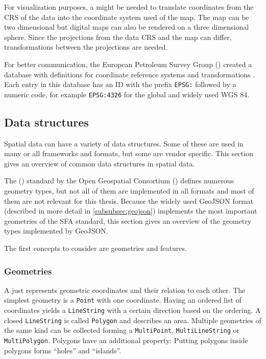 		For visualization purposes, a  might be needed to translate coordinates from the CRS of the data into the coordinate system used of the map.
		The map can be two dimensional but digital maps can also be rendered on a three dimensional sphere.
		Since the projections from the data CRS and the map can differ, transformations between the projections are needed.
		
		For better communication, the European Petroleum Survey Group () created a database with definitions for coordinate reference systems and transformations \cite{epsg}.
		Each entry in this database has an ID with the prefix \texttt{EPSG:} followed by a numeric code, for example \texttt{EPSG:4326} for the global and widely used WGS 84.
		
	\subsection{Data structures}
	\label{subsec:data-structures}
	
		Spatial data can have a variety of data structures.
		Some of these are used in many or all frameworks and formats, but some are vendor specific.
		This section gives an overview of common data structures in spatial data.
		
		The  () standard by the Open Geospatial Consortium () defines numerous geometry types\cite{ogc-sfa}, but not all of them are implemented in all formats and most of them are not relevant for this thesis.
		Because the widely used GeoJSON format (described in more detail in \cref{subsubsec:geojson}) implements the most important geometries of the SFA standard\cite{ietf-geojson}, this section gives an overview of the geometry types implemented by GeoJSON.
		
		The first concepts to consider are geometries and features.
		
		\subsubsection{Geometries}
		
			A  just represents geometric coordinates and their relation to each other.
			The simplest geometry is a \texttt{Point} with one coordinate.
			Having an ordered list of coordinates yields a \texttt{LineString} with a certain direction based on the ordering.
			A closed \texttt{LineString} is called \texttt{Polygon} and describes an area.
			Multiple geometries of the same kind can be collected forming a \texttt{MultiPoint}, \texttt{MultiLineString} or \texttt{MultiPolygon}.
			Polygons have an additional property:
			Putting polygons inside polygons forms \enquote{holes} and \enquote{islands}.
		

